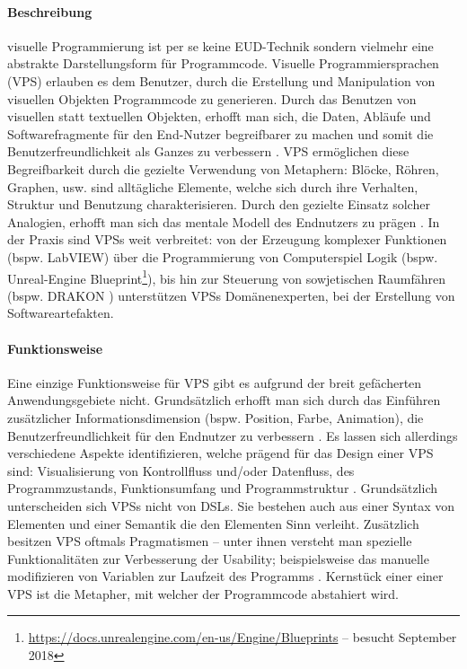 \paragraph{Beschreibung} visuelle Programmierung ist per se keine \ac{EUD}-Technik sondern vielmehr eine abstrakte Darstellungsform für Programmcode. Visuelle Programmiersprachen (VPS)  erlauben es dem Benutzer, durch die Erstellung und Manipulation von visuellen Objekten Programmcode zu generieren. Durch das Benutzen von visuellen statt textuellen Objekten, erhofft man sich, die Daten, Abläufe und Softwarefragmente für den End-Nutzer begreifbarer zu machen und somit die Benutzerfreundlichkeit als Ganzes zu verbessern \cite{burnett2002software}. \ac{VPS} ermöglichen diese Begreifbarkeit durch die gezielte Verwendung von Metaphern: Blöcke, Röhren, Graphen, usw. sind alltägliche Elemente, welche sich durch ihre Verhalten, Struktur und Benutzung charakterisieren. Durch den gezielte Einsatz solcher Analogien, erhofft man sich das mentale Modell des Endnutzers zu prägen \cite{Myers1986vis}. In der Praxis sind \acp{VPS} weit verbreitet: von der Erzeugung komplexer Funktionen (bspw. LabVIEW) über die Programmierung von Computerspiel Logik (bspw. Unreal-Engine Blueprint\footnote{\url{https://docs.unrealengine.com/en-us/Engine/Blueprints} -- besucht September 2018}), bis hin zur Steuerung von sowjetischen Raumfähren (bspw. DRAKON \cite{parondzhanov1995drakon}) unterstützen \acp{VPS} Domänenexperten, bei der Erstellung von Softwareartefakten. 

\paragraph{Funktionsweise} Eine einzige Funktionsweise für \ac{VPS} gibt es aufgrund der breit gefächerten Anwendungsgebiete nicht. Grundsätzlich erhofft man sich durch das Einführen zusätzlicher Informationsdimension (bspw. Position, Farbe, Animation), die Benutzerfreundlichkeit für den Endnutzer zu verbessern \cite{Myers1986vis}. Es lassen sich allerdings verschiedene Aspekte identifizieren, welche prägend für das Design einer \ac{VPS} sind: Visualisierung von Kontrollfluss und/oder Datenfluss, des Programmzustands, Funktionsumfang und Programmstruktur \cite{boshernitsan2004visual}. Grundsätzlich unterscheiden sich \acp{VPS} nicht von \acp{DSL}. Sie bestehen auch aus einer Syntax von Elementen und einer Semantik die den Elementen Sinn verleiht. Zusätzlich besitzen \ac{VPS} oftmals Pragmatismen -- unter ihnen versteht man spezielle Funktionalitäten zur Verbesserung der Usability; beispielsweise das manuelle modifizieren von Variablen zur Laufzeit des Programms \cite{Repenning2017MovingBS}. Kernstück einer einer \ac{VPS} ist die Metapher, mit welcher der Programmcode abstahiert wird. 

